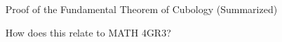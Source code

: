 \documentclass[final]{beamer}
\newlength{\sepwidth}
\newlength{\colwidth}
\newcommand{\separatorcolumn}{\begin{column}{\sepwidth}\end{column}}
\begin{document}
\begin{frame}[t]
\begin{columns}[t]
\begin{column}{\colwidth}


\end{column}

\separatorcolumn

\begin{column}{\colwidth}

  \begin{block}{Proof of the Fundamental Theorem of Cubology (Summarized)}



    

    

  \end{block}

  \begin{alertblock}{How does this relate to MATH 4GR3?}



\end{alertblock}
\end{column}
\end{columns}
\end{frame}
\end{document}
